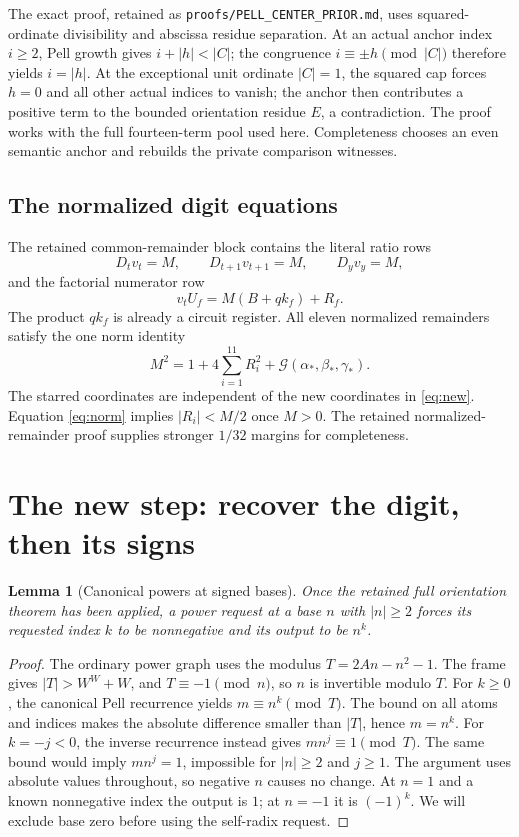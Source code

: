 \documentclass[11pt,letterpaper]{article}
\newtheorem{lemma}[theorem]{Lemma}
\newcommand{\G}{\mathcal G}
\newcommand{\file}[1]{\texttt{\nolinkurl{#1}}}
\begin{document}
The exact proof, retained as \file{proofs/PELL_CENTER_PRIOR.md}, uses
squared-ordinate divisibility and abscissa residue separation.
At an actual anchor index $i\ge2$, Pell growth gives
$i+|h|<|C|$; the congruence $i\equiv\pm h\pmod{|C|}$ therefore yields
$i=|h|$. At the exceptional unit ordinate $|C|=1$, the squared cap
forces $h=0$ and all other actual indices to vanish; the anchor then
contributes a positive term to the bounded orientation residue $E$,
a contradiction. The proof works with the full fourteen-term pool
used here. Completeness chooses an even semantic anchor and rebuilds
the private comparison witnesses.

\subsection{The normalized digit equations}

The retained common-remainder block contains the literal ratio rows
\begin{equation}\label{eq:ratios}
 D_t v_t=M,\qquad D_{t+1}v_{t+1}=M,\qquad D_yv_y=M,
\end{equation}
and the factorial numerator row
\begin{equation}\label{eq:digit}
 v_t U_f=M(B+qk_f)+R_f.
\end{equation}
The product $qk_f$ is already a circuit register. All eleven
normalized remainders satisfy the one norm identity
\begin{equation}\label{eq:norm}
 M^2=1+4\sum_{i=1}^{11}R_i^2+\G(\alpha_*,\beta_*,\gamma_*).
\end{equation}
The starred coordinates are independent of the new coordinates in
\eqref{eq:new}. Equation \eqref{eq:norm} implies $|R_i|<M/2$ once
$M>0$. The retained normalized-remainder proof supplies stronger
$1/32$ margins for completeness.

\section{The new step: recover the digit, then its signs}
\label{sec:new}

\begin{lemma}[Canonical powers at signed bases]\label{lem:signed}
Once the retained full orientation theorem has been applied, a power
request at a base $n$ with $|n|\ge2$ forces its requested index $k$
to be nonnegative and its output to be $n^k$.
\end{lemma}
\begin{proof}
The ordinary power graph uses the modulus
$T=2An-n^2-1$. The frame gives
$|T|>W^W+W$, and $T\equiv-1\pmod n$, so $n$ is invertible modulo
$T$. For $k\ge0$, the canonical Pell recurrence yields
$m\equiv n^k\pmod T$. The bound on all atoms and indices makes the
absolute difference smaller than $|T|$, hence $m=n^k$.
For $k=-j<0$, the inverse recurrence instead gives
$mn^j\equiv1\pmod T$. The same bound would imply $mn^j=1$,
impossible for $|n|\ge2$ and $j\ge1$.
The argument uses absolute values throughout, so negative $n$ causes
no change. At $n=1$ and a known nonnegative index the output is $1$;
at $n=-1$ it is $(-1)^k$. We will exclude base zero before using the
self-radix request.
\end{proof}
\end{document}
